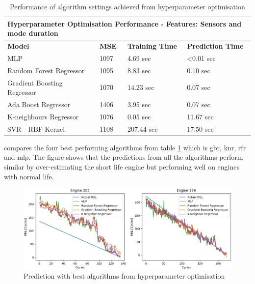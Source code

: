 \documentclass[english, a4paper]{report}
\begin{document}
{{{{                \begin{table}[H]
                    \centering
                    \begin{tabular}{|l|l|l|l|}
                        \hline \multicolumn{4}{|l|}{\textbf{Hyperparameter Optimisation Performance - Features: Sensors and mode duration}} \\ \hline
                        \textbf{Model} & \textbf{MSE} & \textbf{Training Time} & \textbf{Prediction Time} \\ \hline
                        MLP & 1097 & 4.69 sec & \textless0.01 sec \\ \hline
                        Random Forest Regressor & 1095 & 8.83 sec & 0.10 sec \\ \hline
                        Gradient Boosting Regressor & 1070 & 14.23 sec & 0.07 sec \\ \hline
                        Ada Boost Regressor & 1406 & 3.95 sec & 0.07 sec \\ \hline
                        K-neighbours Regressor & 1076 & 0.05 sec & 11.67 sec \\ \hline
                        SVR - RBF Kernel & 1108 & 207.44 sec & 17.50 sec \\ \hline
                    \end{tabular}
                    \caption{Performance of algorithm settings achieved from hyperparameter optimisation}
                    \label{allModelPerformanceNASA}
                \end{table}
                
                 compares the four best performing algorithms from table \ref{allModelPerformanceNASA} which is \gls{gbr}, \gls{knr}, \gls{rfr} and \gls{mlp}. The figure shows that the predictions from all the algorithms perform similar by over-estimating the short life engine but performing well on engines with normal life.
                
                \begin{figure}[H]
                    \centering \includegraphics[width=1\linewidth]{NasaOptModelsAll}
                    \caption{Prediction with best algorithms from hyperparameter optimisation}
                    \label{fig:NASAbestOpt}
                \end{figure}
                
}}}}
\end{document}
